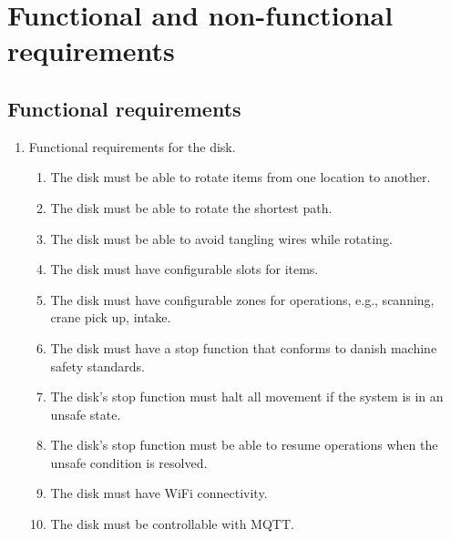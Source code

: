 \section{Functional and non-functional requirements}\label{appendix:requirements}

\subsection{Functional requirements}\label{appendix:functional-requirements}
\begin{enumerate}
    \item Functional requirements for the disk.
    \begin{enumerate}
        \item The disk must be able to rotate items from one location to another.
        \item The disk must be able to rotate the shortest path.
        \item The disk must be able to avoid tangling wires while rotating.
        \item The disk must have configurable slots for items.
        \item The disk must have configurable zones for operations, e.g., scanning, crane pick up, intake.
        \item The disk must have a stop function that conforms to danish machine safety standards.
        \item The disk's stop function must halt all movement if the system is in an unsafe state.
        \item The disk's stop function must be able to resume operations when the unsafe condition is resolved.
        \item The disk must have WiFi connectivity.
        \item The disk must be controllable with MQTT.
    \end{enumerate}
    \vspace{1em}
    

\end{enumerate}

